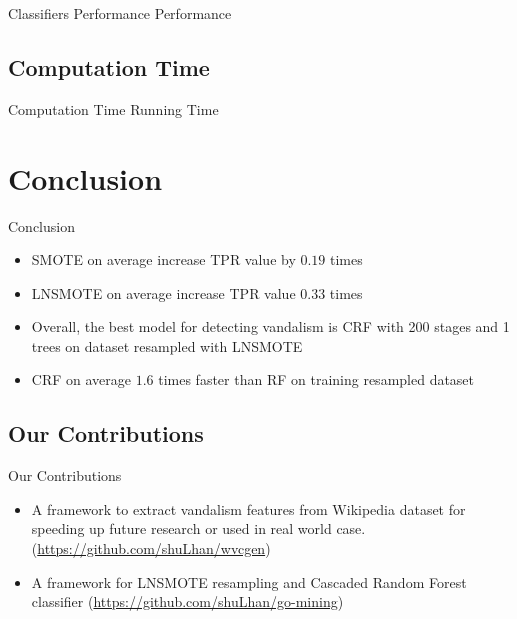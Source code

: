 \documentclass[english]{beamer}
\begin{document}
\begin{frame}
	{Classifiers Performance}
	{Performance}
	
\end{frame}

\subsection{Computation Time}

\begin{frame}
	{Computation Time}
	{Running Time}
	
\end{frame}


\section{Conclusion}

\begin{frame}
	\begin{multicols}{2}
		\tableofcontents[currentsection]
	\end{multicols}
\end{frame}

\begin{frame}
	{Conclusion}
	\begin{itemize}
		\item SMOTE on average increase TPR value by $0.19$ times
		\item LNSMOTE on average increase TPR value $0.33$ times
		\item Overall, the best model for detecting vandalism is CRF with 200
		stages and 1 trees on dataset resampled with LNSMOTE
		\item CRF on average $1.6$ times faster than RF on training resampled
		dataset
	\end{itemize}
\end{frame}

\subsection{Our Contributions}
\begin{frame}
	{Our Contributions}
	\begin{itemize}
		\item A framework to extract vandalism features from Wikipedia dataset
		for speeding up future research or used in real world case.
		(\url{https://github.com/shuLhan/wvcgen})
		\item A framework for LNSMOTE resampling and Cascaded Random Forest
		classifier
		(\url{https://github.com/shuLhan/go-mining})
	\end{itemize}
\end{frame}
\end{document}
